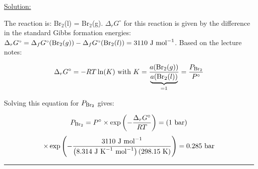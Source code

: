\noindent
\underline{Solution:}

The reaction is: Br$_2$(l) = Br$_2$(g). $\Delta_rG^\circ$ for this reaction is given by the difference in the standard Gibbs formation energies: $\Delta_rG^\circ = \Delta_fG^\circ(\textnormal{Br}_2(g)) - \Delta_fG^\circ(\textnormal{Br}_2(l)) = 3110\textnormal{ J mol}^{-1}$. Based on the lecture notes:

$$\Delta_rG^\circ = -RT\ln(K)\textnormal{ with }K=\frac{a(\textnormal{Br}_2(g))}{\mathop {\underbrace{a(\textnormal{Br}_2(l))}}\limits_{=1}} = \frac{P_{\textnormal{Br}_2}}{P^\circ}$$

Solving this equation for $P_{\textnormal{Br}_2}$ gives:

$$P_{\textnormal{Br}_2} = P^\circ\times \exp\left(-\frac{\Delta_rG^\circ}{RT}\right) = \left(1\textnormal{ bar}\right)$$
$$\times\exp\left(-\frac{3110\textnormal{ J mol}^{-1}}{\left(8.314\textnormal{ J K}^{-1}\textnormal{ mol}^{-1}\right)\left(298.15\textnormal{ K}\right)}\right) = 0.285\textnormal{ bar}$$

\hrule\vspace{0.5cm}
